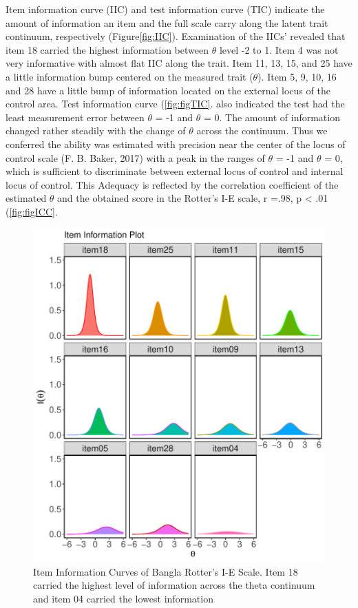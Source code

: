 \documentclass[
  english,
  man]{apa6}
\begin{document}
Item information curve (IIC) and test information curve (TIC) indicate the amount of information an item and the full scale carry along the latent trait continuum, respectively (Figure\ref{fig:IIC}). Examination of the IICs' revealed that item 18 carried the highest information between \(\theta\) level -2 to 1. Item 4 was not very informative with almost flat IIC along the trait. Item 11, 13, 15, and 25 have a little information bump centered on the measured trait (\(\theta\)). Item 5, 9, 10, 16 and 28 have a little bump of information located on the external locus of the control area. Test information curve (\ref{fig:figTIC}. also indicated the test had the least measurement error between \(\theta\) = -1 and \(\theta\) = 0. The amount of information changed rather steadily with the change of \(\theta\) across the continuum. Thus we conferred the ability was estimated with precision near the center of the locus of control scale (F. B. Baker, 2017) with a peak in the ranges of \(\theta\) = -1 and \(\theta\) = 0, which is sufficient to discriminate between external locus of control and internal locus of control. This Adequacy is reflected by the correlation coefficient of the estimated \(\theta\) and the obtained score in the Rotter's I-E scale, r =.98, p \textless{} .01 (\ref{fig:figICC}.

\begin{figure}
\includegraphics[width=7in]{Figures/600/ifc} \caption{Item Information Curves of Bangla Rotter’s I-E Scale. Item 18 carried the highest level of information across the theta continuum and item 04 carried the lowest information}\label{fig:FigTIC}
\end{figure}
\end{document}
